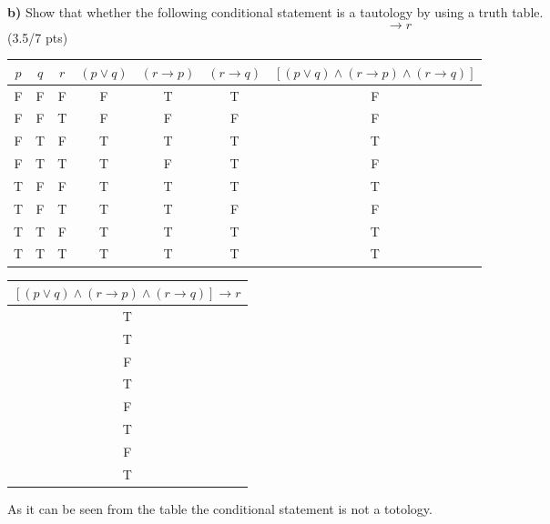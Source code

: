 \documentclass[a4paper,12pt]{article}
\newcommand\tab[1][1cm]{\hspace*{#1}}
\begin{document}
\tab \textbf{b)} Show that whether the following conditional statement is a tautology by using a truth table.
\begin{equation*}
    [(p \vee q) \wedge (r \rightarrow p) \wedge (r \rightarrow q)] \rightarrow r
\end{equation*}
\hfill \small{(3.5/7 pts)}\\
\begin{tcolorbox}
\begin{center}
    \begin{tabular}{|c|c|c|c|c|c|c|}
    \hline
    $p$ & $q$ & $r$ & $(p \vee q)$ & $(r \rightarrow p)$ & $(r \rightarrow q)$ & $[(p \vee q) \wedge (r \rightarrow p) \wedge (r \rightarrow q)]$\\
    \hline \hline
    F & F & F & F & T & T & F \\
    \hline
    F & F & T & F & F & F & F \\
    \hline
    F & T & F & T & T & T & T \\
    \hline
    F & T & T & T & F & T & F \\
    \hline
    T & F & F & T & T & T & T \\
    \hline
    T & F & T & T & T & F & F \\
    \hline
    T & T & F & T & T & T & T \\
    \hline
    T & T & T & T & T & T & T \\
    \hline
\end{tabular}
\end{center}

\begin{center}
    \begin{tabular}{|c|}
    \hline
    $[(p \vee q) \wedge (r \rightarrow p) \wedge (r \rightarrow q)] \rightarrow r$ \\
    \hline \hline
    T\\
    \hline
    T\\
    \hline
    F\\
    \hline
    T\\
    \hline
    F\\
    \hline
    T\\
    \hline
    F\\
    \hline
    T\\
    \hline
\end{tabular}    
\end{center}
As it can be seen from the table the conditional statement is not a totology.
\end{tcolorbox}
\end{document}

